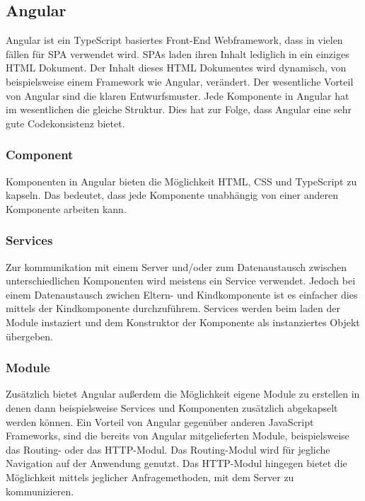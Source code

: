 \documentclass[11pt]{article}
\begin{document}
	\subsection{Angular}
	\label{sec: angular}
	Angular ist ein TypeScript basiertes Front-End Webframework, dass in vielen fällen für \gls{SPA} verwendet wird. \gls{SPA}s laden ihren Inhalt lediglich in ein einziges \gls{HTML} Dokument. Der Inhalt dieses \gls{HTML} Dokumentes wird dynamisch, von beispielsweise einem Framework wie Angular, verändert. Der wesentliche Vorteil von Angular sind die klaren Entwurfsmuster. Jede Komponente in Angular hat im wesentlichen die gleiche Struktur. Dies hat zur Folge, dass Angular eine sehr gute Codekonsistenz bietet.
	
	
	\subsubsection{Component}
	\label{sec: ang-component}
	Komponenten in Angular bieten die Möglichkeit \gls{HTML}, \gls{CSS} und TypeScript zu kapseln. Das bedeutet, dass jede Komponente unabhängig von einer anderen Komponente arbeiten kann.
	
	\subsubsection{Services}
	\label{sec: ang-service}
	Zur kommunikation mit einem Server und/oder zum Datenaustausch zwischen unterschiedlichen Komponenten wird meistens ein Service verwendet. Jedoch bei einem Datenaustausch zwichen Eltern- und Kindkomponente ist es einfacher dies mittels der Kindkomponente durchzuführem. Services werden beim laden der Module instaziert und dem Konstruktor der Komponente als instanziertes Objekt übergeben.
	
	\subsubsection{Module}
	\label{sec: ang-modul}
	Zusätzlich bietet Angular außerdem die Möglichkeit eigene Module zu erstellen in denen dann beispielsweise Services und Komponenten zusätzlich abgekapselt werden können. Ein Vorteil von Angular gegenüber anderen JavaScript Frameworks, sind die bereits von Angular mitgelieferten Module, beispielsweise das Routing- oder das HTTP-Modul. Das Routing-Modul wird für jegliche Navigation auf der Anwendung genutzt. Das \gls{HTTP}-Modul hingegen bietet die Möglichkeit mittels jeglicher Anfragemethoden, mit dem Server zu kommunizieren.
	
\end{document}
